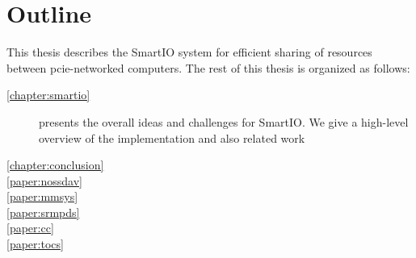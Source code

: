 \section{Outline}
This thesis describes the SmartIO system for efficient sharing of resources between \gls{pcie}-networked computers.
%
The rest of this thesis is organized as follows:
\begin{description}
    \item[\cref{chapter:smartio}]
        presents the overall ideas and challenges for SmartIO. 
        We give a high-level overview of the implementation and 
        also related work

    \item[\cref{chapter:conclusion}]

    \item[\cref{paper:nossdav}]

    \item[\cref{paper:mmsys}]

    \item[\cref{paper:srmpds}]

    \item[\cref{paper:cc}]

    \item[\cref{paper:tocs}]
\end{description}

